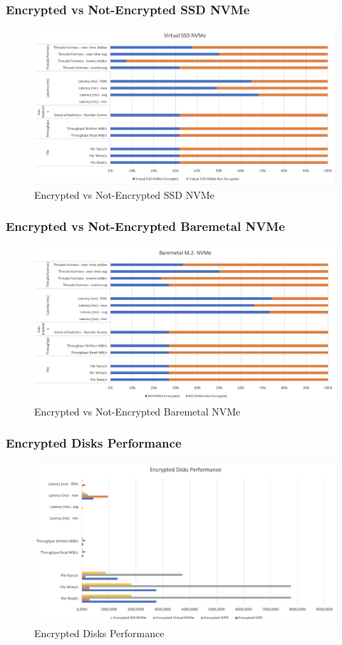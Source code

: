 \subsubsection{Encrypted vs Not-Encrypted SSD NVMe}
\begin{figure}
  \includegraphics[width=15cm]{images/image9.png}
  \centering
  \caption{Encrypted vs Not-Encrypted SSD NVMe}
\end{figure}
\subsubsection{Encrypted vs Not-Encrypted Baremetal NVMe}
\begin{figure}
  \includegraphics[width=15cm]{images/image10.png}
  \centering
  \caption{Encrypted vs Not-Encrypted Baremetal NVMe}
\end{figure}
\newpage
\subsubsection{Encrypted Disks Performance}
\begin{figure}
  \includegraphics[width=16cm]{images/image11.png}
  \centering
  \caption{Encrypted Disks Performance}
\end{figure}
